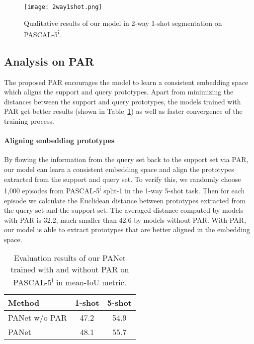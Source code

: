 \documentclass[10pt,twocolumn,letterpaper]{article}
\begin{document}
\begin{figure}[t!]
\begin{center}
   \texttt{[image: 2way1shot.png]}
\end{center}
   \caption{Qualitative results of our model in 2-way 1-shot segmentation on PASCAL-5\textsuperscript{i}.}
\label{fig:2way1shot}
\end{figure}

\vspace{-2mm}
\subsection{Analysis on PAR} \label{experiment-par}


The proposed PAR encourages the model to learn a consistent embedding space which aligns the support and query prototypes. Apart from minimizing the distances between the support and query prototypes, the models trained with PAR get better results (shown in Table~\ref{table:ablation}) as well as faster convergence of the training process.

\vspace{-12pt}
\paragraph{Aligning embedding prototypes} By flowing the information from the query set back to the support set via PAR, our model can learn a consistent embedding space and align the prototypes extracted from the support and query set. To verify this, we randomly choose 1,000 episodes from PASCAL-5\textsuperscript{i} split-1 in the 1-way 5-shot task. Then for each episode we calculate the Euclidean distance between prototypes extracted from the query set and the support set. The averaged distance computed by models with PAR is 32.2, much smaller than 42.6 by models without PAR. With PAR, our model is able to extract prototypes that are better aligned in the embedding space.

\begin{table}[t]
\centering
 \begin{tabular}{l|cc} 
\toprule
 Method & 1-shot & 5-shot
 \\
 \midrule
 PANet w/o  PAR & 47.2 & 54.9
 \\
 PANet & 48.1 & 55.7
 \\
\bottomrule
 \end{tabular}
 \caption{Evaluation results of our PANet trained with and without PAR on PASCAL-5\textsuperscript{i} in mean-IoU metric.}
\label{table:ablation}
\end{table}
\end{document}
